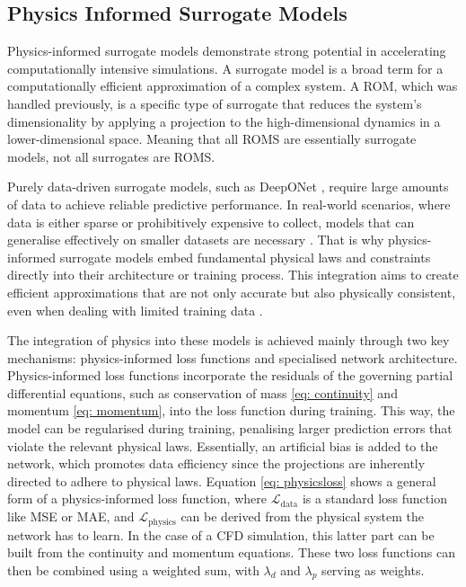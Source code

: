 \subsection{Physics Informed Surrogate Models}
\label{subsect: PIsurrogates}
Physics-informed surrogate models demonstrate strong potential in accelerating computationally intensive simulations. A surrogate model is a broad term for a computationally efficient approximation of a complex system. A ROM, which was handled previously, is a specific type of surrogate that reduces the system's dimensionality by applying a projection to the high-dimensional dynamics in a lower-dimensional space. Meaning that all ROMS are essentially surrogate models, not all surrogates are ROMS. 

Purely data-driven surrogate models, such as DeepONet \cite{Lu2021}, require large amounts of data to achieve reliable predictive performance. In real-world scenarios, where data is either sparse or prohibitively expensive to collect, models that can generalise effectively on smaller datasets are necessary \cite{Donnelly2024}. That is why physics-informed surrogate models embed fundamental physical laws and constraints directly into their architecture or training process. This integration aims to create efficient approximations that are not only accurate but also physically consistent, even when dealing with limited training data \cite{Raissi2019}. 

The integration of physics into these models is achieved mainly through two key mechanisms: physics-informed loss functions and specialised network architecture. Physics-informed loss functions incorporate the residuals of the governing partial differential equations, such as conservation of mass \ref{eq: continuity} and momentum \ref{eq: momentum}, into the loss function during training. This way, the model can be regularised during training, penalising larger prediction errors that violate the relevant physical laws. Essentially, an artificial bias is added to the network, which promotes data efficiency since the projections are inherently directed to adhere to physical laws. Equation \ref{eq: physicsloss} shows a general form of a physics-informed loss function, where $\mathcal{L}_{\text{data}}$ is a standard loss function like MSE or MAE, and $\mathcal{L}_{\text{physics}}$ can be derived from the physical system the network has to learn. In the case of a CFD simulation, this latter part can be built from the continuity and momentum equations. These two loss functions can then be combined using a weighted sum, with $\lambda_d$ and $\lambda_p$ serving as weights.

